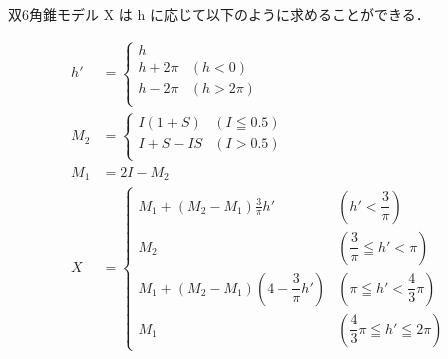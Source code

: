 \documentclass[8pt, jfont=ipaexm, t]{beamer} %
\begin{document}
\begin{frame}[allowframebreaks]{双6角錐モデル}
\newpage
X は h に応じて以下のように求めることができる． 

\begin{equation}
\begin{aligned}
h' &=
\begin{cases}
    h \\
    h + 2 \pi & (h < 0) \\ 
    h - 2 \pi & (h > 2\pi) \\
\end{cases}
\\
M_2 &= 
\begin{cases}
    I(1 + S) & (I \leqq 0.5) \\
    I + S - IS & (I > 0.5) \\
\end{cases}
\\
M_1 &= 2I - M_2 \\
X &= 
\begin{cases}
M_1 + \left(M_2 - M_1\right) \frac{3}{\pi}h' & \left(h' < \dfrac{3}{\pi}\right) \\
M_2 & \left(\dfrac{3}{\pi} \leqq h' < \pi\right) \\
M_1 + \left(M_2 - M_1\right)\left(4 - \dfrac{3}{\pi}h'\right) & \left(\pi \leqq h' < \dfrac{4}{3}\pi\right) \\
M_1 & \left(\dfrac{4}{3}\pi \leqq h' \leqq 2\pi\right)
\end{cases}
\end{aligned}
\end{equation}

\end{frame}
\end{document}
